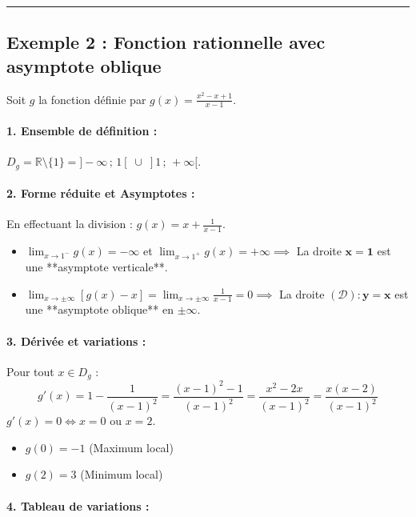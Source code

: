 \documentclass[12pt,a4paper]{article}
\begin{document}
\vspace{0.3cm}
\hrule
\vspace{0.3cm}

\subsection*{\color{myred}Exemple 2 : Fonction rationnelle avec asymptote oblique}

Soit $g$ la fonction définie par $g(x) = \frac{x^2 - x + 1}{x - 1}$.

\paragraph{1. Ensemble de définition :} $D_g = \mathbb{R} \setminus \{1\} = ]-\infty \,;\, 1[ \;\cup\; ]1 \,;\, +\infty[$.

\paragraph{2. Forme réduite et Asymptotes :}
En effectuant la division : $g(x) = x + \frac{1}{x - 1}$.
\begin{itemize}
    \item $\lim_{x \to 1^-} g(x) = -\infty$ et $\lim_{x \to 1^+} g(x) = +\infty \implies$ La droite $\mathbf{x = 1}$ est une **asymptote verticale**.
    \item $\lim_{x \to \pm\infty} [g(x) - x] = \lim_{x \to \pm\infty} \frac{1}{x - 1} = 0 \implies$ La droite $(\mathcal{D}) : \mathbf{y = x}$ est une **asymptote oblique** en $\pm\infty$.
\end{itemize}

\paragraph{3. Dérivée et variations :}
Pour tout $x \in D_g$ :
\[
g'(x) = 1 - \frac{1}{(x - 1)^2} = \frac{(x - 1)^2 - 1}{(x - 1)^2} = \frac{x^2 - 2x}{(x - 1)^2} = \frac{x(x - 2)}{(x - 1)^2}
\]
$g'(x) = 0 \iff x = 0$ ou $x = 2$.
\begin{itemize}
    \item $g(0) = -1$ (Maximum local)
    \item $g(2) = 3$ (Minimum local)
\end{itemize}

\paragraph{4. Tableau de variations :}
\begin{center}
\end{center}
\end{document}
